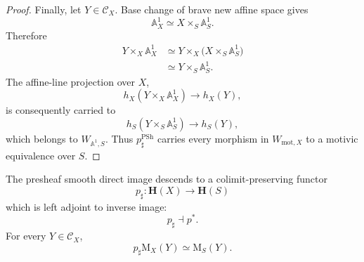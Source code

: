 \begin{proof}
Finally, let \(Y\in\mathcal C_X\). Base change of brave new affine
space gives
\[
    \mathbb A^1_X
    \simeq
    X\times_S\mathbb A^1_S.
\]
Therefore
\[
\begin{aligned}
    Y\times_X\mathbb A^1_X
    &\simeq
    Y\times_X
    \bigl(
        X\times_S\mathbb A^1_S
    \bigr)
    \\
    &\simeq
    Y\times_S\mathbb A^1_S.
\end{aligned}
\]
The affine-line projection over \(X\),
\[
    h_X(Y\times_X\mathbb A^1_X)
    \longrightarrow
    h_X(Y),
\]
is consequently carried to
\[
    h_S(Y\times_S\mathbb A^1_S)
    \longrightarrow
    h_S(Y),
\]
which belongs to \(W_{\mathbb A^1,S}\). Thus
\(p^{\operatorname{PSh}}_\sharp\) carries every morphism in
\(W_{\mathrm{mot},X}\) to a motivic equivalence over \(S\).
\end{proof}

\begin{theorem}
\label{thm:smooth-motivic-direct-image}
The presheaf smooth direct image descends to a colimit-preserving
functor
\[
    p_\sharp
    \colon
    \mathbf H(X)
    \longrightarrow
    \mathbf H(S)
\]
which is left adjoint to inverse image:
\[
    p_\sharp
    \dashv
    p^*.
\]
For every \(Y\in\mathcal C_X\),
\[
    p_\sharp\mathrm M_X(Y)
    \simeq
    \mathrm M_S(Y).
\]
\end{theorem}

